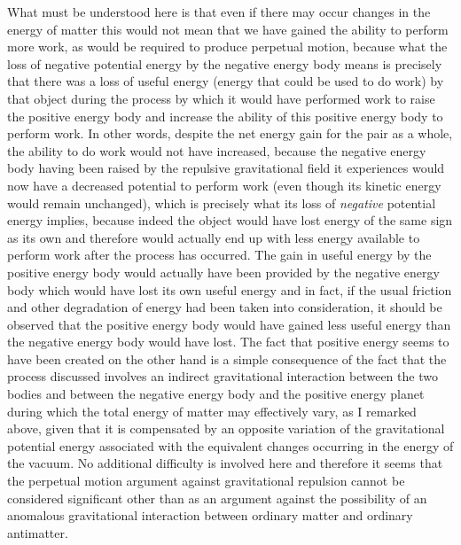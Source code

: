 \documentclass[notitlepage,12pt]{report}
\begin{document}
What must be understood here is that even if there may occur changes in the energy of matter this would not mean that we have gained the ability to perform more work, as would be required to produce perpetual motion, because what the loss of negative potential energy by the negative energy body means is precisely that there was a loss of useful energy (energy that could be used to do work) by that object during the process by which it would have performed work to raise the positive energy body and increase the ability of this positive energy body to perform work. In other words, despite the net energy gain for the pair as a whole, the ability to do work would not have increased, because the negative energy body having been raised by the repulsive gravitational field it experiences would now have a decreased potential to perform work (even though its kinetic energy would remain unchanged), which is precisely what its loss of \textit{negative} potential energy implies, because indeed the object would have lost energy of the same sign as its own and therefore would actually end up with less energy available to perform work after the process has occurred. The gain in useful energy by the positive energy body would actually have been provided by the negative energy body which would have lost its own useful energy and in fact, if the usual friction and other degradation of energy had been taken into consideration, it should be observed that the positive energy body would have gained less useful energy than the negative energy body would have lost. The fact that positive energy seems to have been created on the other hand is a simple consequence of the fact that the process discussed involves an indirect gravitational interaction between the two bodies and between the negative energy body and the positive energy planet during which the total energy of matter may effectively vary, as I remarked above, given that it is compensated by an opposite variation of the gravitational potential energy associated with the equivalent changes occurring in the energy of the vacuum. No additional difficulty is involved here and therefore it seems that the perpetual motion argument against gravitational repulsion cannot be considered significant other than as an argument against the possibility of an anomalous gravitational interaction between ordinary matter and ordinary antimatter.
\end{document}
